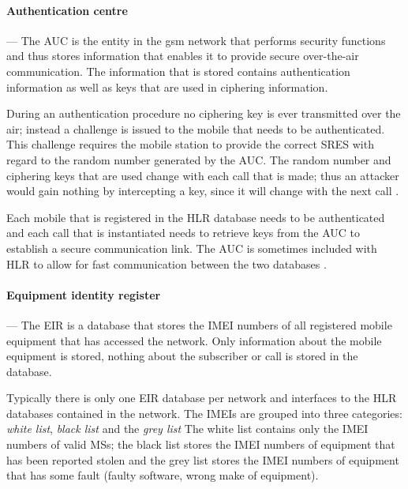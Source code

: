 \paragraph{Authentication centre}
--- The AUC is the entity in the \gls{gsm} network that performs security functions and thus stores information that enables it to provide secure over-the-air communication\cite{GSM92,GSMSysEngin}. The information that is stored contains authentication information as well as keys that are used in ciphering information\cite{GSM92,GSMSysEngin}.

During an authentication procedure no ciphering key is ever transmitted over the air; instead a challenge is issued to the mobile that needs to be authenticated. This challenge requires the mobile station to provide the correct \gls{SRES} with regard to the random number generated by the \gls{AUC}\cite{GSM92,GSMSysEngin}. The random number and ciphering keys that are used change with each call that is made; thus an attacker would gain nothing by intercepting a key, since it will change with the next call \cite{GSMSysEngin}.

Each mobile that is registered in the \gls{HLR} database needs to be authenticated and each call that is instantiated needs to retrieve keys from the AUC to establish a secure communication link\cite{GSM92,GSMSysEngin}. The AUC is sometimes included with \gls{HLR} to allow for fast communication between the two databases \cite{GSMSysEngin}.

\paragraph{Equipment identity register}
--- The \gls{EIR} is a database that stores the \gls{IMEI} numbers of all registered mobile equipment that has accessed the network\cite{GSMSysEngin}. Only information about the mobile equipment is stored, nothing about the subscriber or call is stored in the database\cite{GSMSysEngin}.

Typically there is only one \gls{EIR} database per network and interfaces to the \gls{HLR} databases contained in the network\cite{GSMSysEngin}. The \glspl{IMEI} are grouped into three categories: \emph{white list}, \emph{black list} and the \emph{grey list}\cite{GSMSysEngin} The white list contains only the \gls{IMEI} numbers of valid \glspl{MS}; the black list stores the \gls{IMEI} numbers of equipment that has been reported stolen and the grey list stores the \gls{IMEI} numbers of equipment that has some fault (faulty software, wrong make of equipment)\cite{GSMSysEngin}.

